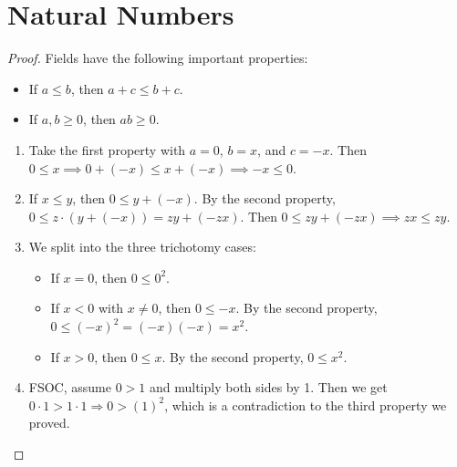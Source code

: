 \documentclass{report}
\begin{document}
\section{Natural Numbers}
\begin{proof}
    Fields have the following important properties:
    \begin{itemize}
        \item If $a \leq b$, then $a + c \leq b + c$.
        \item If $a, b \geq 0$, then $ab \geq 0$.
    \end{itemize}
    \begin{enumerate}
        \item Take the first property with $a = 0$, $b = x$, and $c = -x$. Then $0 \leq x \implies 0 + (-x) \leq x + (-x) \implies -x \leq 0$.
        \item If $x \leq y$, then $0 \leq y + (-x)$. By the second property, $0 \leq z \cdot(y + (-x)) = zy + (-zx)$. Then $0 \leq zy + (-zx) \implies zx \leq zy$. 
        \item We split into the three trichotomy cases:
        \begin{itemize}
            \item If $x = 0$, then $0 \leq 0^2$.
            \item If $x < 0$ with $x \neq 0$, then $0 \leq -x$. By the second property, $0 \leq (-x)^2 = (-x)(-x) = x^2$.
            \item If $x > 0$, then $0 \leq x$. By the second property, $0 \leq x^2$.
        \end{itemize}
        \item FSOC, assume $0 > 1$ and multiply both sides by 1. Then we get $0 \cdot 1 > 1 \cdot 1 \Rightarrow 0 > (1)^{2}$, which is a contradiction to the third property we proved.
    \end{enumerate}
\end{proof}
\end{document}
